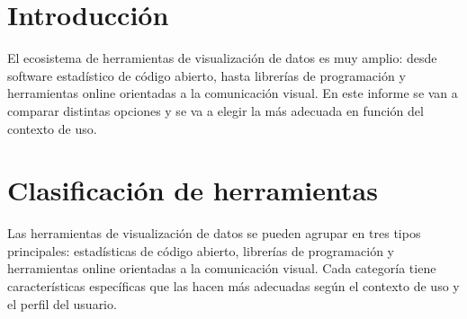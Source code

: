 \documentclass{../../miPlantilla}
\begin{document}
\maketitle

\section{Introducción}
El ecosistema de herramientas de visualización de datos es muy amplio: desde software estadístico de código abierto,
hasta librerías de programación y herramientas online orientadas a la comunicación visual. En este informe se van a 
comparar distintas opciones y se va a elegir la más adecuada en función del contexto de uso.

\section{Clasificación de herramientas}

Las herramientas de visualización de datos se pueden agrupar en tres tipos principales: estadísticas de código abierto,
librerías de programación y herramientas online orientadas a la comunicación visual. Cada categoría tiene características
específicas que las hacen más adecuadas según el contexto de uso y el perfil del usuario.
\end{document}
